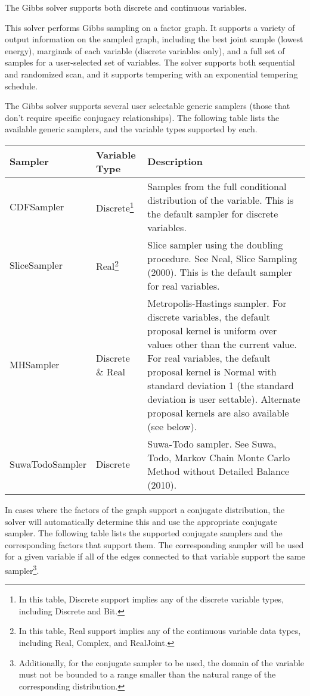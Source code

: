 The Gibbs solver supports both discrete and continuous variables.

This solver performs Gibbs sampling on a factor graph.  It supports a variety of output information on the sampled graph, including the best joint sample (lowest energy), marginals of each variable (discrete variables only), and a full set of samples for a user-selected set of variables.  The solver supports both sequential and randomized scan, and it supports tempering with an exponential tempering schedule.

The Gibbs solver supports several user selectable generic samplers (those that don't require specific conjugacy relationships).  The following table lists the available generic samplers, and the variable types supported by each.

\begin{longtable} {l l p{8.0cm}}
Sampler & Variable Type &  Description \\
\hline
\endhead
CDFSampler & Discrete\footnote{In this table, Discrete support implies any of the discrete variable types, including Discrete and Bit.} & Samples from the full conditional distribution of the variable.  This is the default sampler for discrete variables. \\
SliceSampler & Real\footnote{In this table, Real support implies any of the continuous variable data types, including Real, Complex, and RealJoint.} & Slice sampler using the doubling procedure.  See Neal, Slice Sampling (2000).  This is the default sampler for real variables. \\
MHSampler & Discrete \& Real & Metropolis-Hastings sampler.  For discrete variables, the default proposal kernel is uniform over values other than the current value.  For real variables, the default proposal kernel is Normal with standard deviation 1 (the standard deviation is user settable).  Alternate proposal kernels are also available (see below). \\
SuwaTodoSampler & Discrete & Suwa-Todo sampler.  See Suwa, Todo, Markov Chain Monte Carlo Method without Detailed Balance (2010). \\
\end{longtable}


In cases where the factors of the graph support a conjugate distribution, the solver will automatically determine this and use the appropriate conjugate sampler.  The following table lists the supported conjugate samplers and the corresponding factors that support them.  The corresponding sampler will be used for a given variable if all of the edges connected to that variable support the same sampler\footnote{Additionally, for the conjugate sampler to be used, the domain of the variable must not be bounded to a range smaller than the natural range of the corresponding distribution.}.

